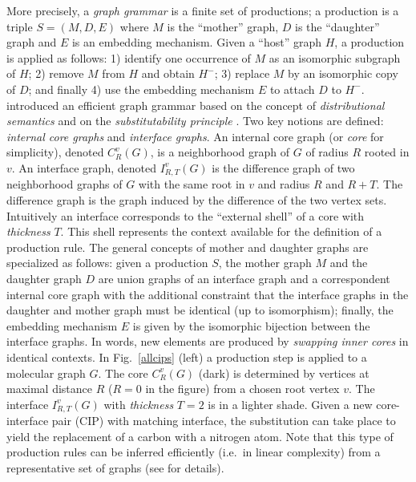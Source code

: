 \documentclass[a4paper]{esannV2}
\begin{document}
More precisely, a {\em graph grammar} \citep{rozenberg1999handbook} is a
finite set of productions; a production is a triple $S=(M,D,E)$ where $M$ is
the ``mother'' graph, $D$ is the ``daughter'' graph and $E$ is an embedding
mechanism. Given a ``host'' graph $H$, a production is applied as follows: 1)
identify one occurrence of $M$ as an isomorphic subgraph of $H$; 2) remove $M$
from $H$ and obtain $H^-$; 3) replace $M$ by an isomorphic copy of $D$; and
finally 4) use the embedding mechanism $E$ to attach $D$ to $H^-$.
\cite{costa16} introduced an efficient graph grammar based on the concept of
{\em distributional semantics}
\citep{harris1954distributional,harris1968mathematical} and on the {\em
substitutability principle} \citep{Clark:2007}. Two key notions are defined:
{\em internal core graphs}\/ and {\em interface graphs}. An internal core graph
(or {\em core}\/ for simplicity), denoted $C^v_R(G)$, is a neighborhood graph of
$G$ of radius $R$ rooted in $v$. An interface graph, denoted $I^v_{R,T}(G)$ is
the difference graph of two neighborhood graphs of $G$ with the same root in
$v$ and radius $R$ and $R+T$. The difference graph is the graph induced by
the difference of the two vertex sets. Intuitively an interface
corresponds to the ``external shell'' of a core with {\em thickness} $T$. This
shell represents the context available for the definition of a production
rule. The general concepts of mother and daughter graphs are specialized as
follows: given a production $S$, the mother graph $M$ and the daughter graph
$D$ are union graphs of an interface graph and a correspondent internal core
graph with the additional constraint that the interface graphs in the daughter
and mother graph must be identical (up to isomorphism); finally, the embedding
mechanism $E$ is given by the isomorphic bijection between the interface
graphs. In words, new elements are produced by {\em swapping inner cores}\/ in
identical contexts. In Fig.~\ref{allcips} (left) a production step is applied
to a molecular graph $G$. The core $C_{R}^v(G)$ (dark) is determined by
vertices at maximal distance $R$ ($R=0$ in the figure) from a chosen root
vertex $v$. The interface $I_{R,T}^v(G)$ with \emph{thickness} $T=2$ is in a
lighter shade. Given a new core-interface pair (CIP) with matching interface,
the substitution can take place to yield the replacement of a carbon with a
nitrogen atom. Note that this type of production rules can be inferred
efficiently (i.e.\ in linear complexity) from a representative set of graphs
(see \citep{costa16} for details).
\end{document}
